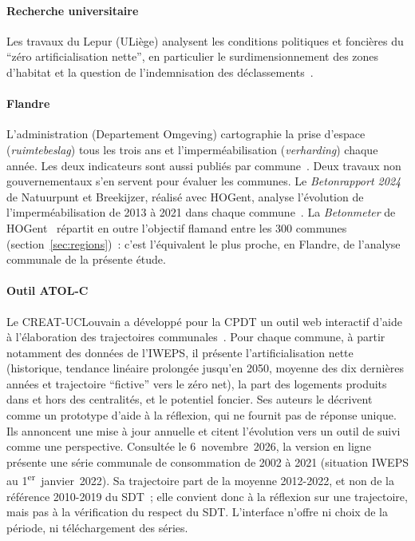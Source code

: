 \documentclass[11pt,a4paper]{report}
\begin{document}
\paragraph{Recherche universitaire} Les travaux du Lepur (ULiège) analysent les conditions politiques et foncières du \enquote{zéro artificialisation nette}, en particulier le surdimensionnement des zones d'habitat et la question de l'indemnisation des déclassements~\citep{halleux2025}.

\paragraph{Flandre} L'administration (Departement Omgeving) cartographie la prise d'espace (\emph{ruimtebeslag}) tous les trois ans et l'imperméabilisation (\emph{verharding}) chaque année. Les deux indicateurs sont aussi publiés par commune~\citep{vlaanderen_landgebruik2025}. Deux travaux non gouvernementaux s'en servent pour évaluer les communes. Le \emph{Betonrapport 2024} de Natuurpunt et Breekijzer, réalisé avec HOGent, analyse l'évolution de l'imperméabilisation de 2013 à 2021 dans chaque commune~\citep{betonrapport2024}. La \emph{Betonmeter} de HOGent~\citep{betonmeter2025} répartit en outre l'objectif flamand entre les 300 communes (section~\ref{sec:regions})~: c'est l'équivalent le plus proche, en Flandre, de l'analyse communale de la présente étude.

\paragraph{Outil ATOL-C} Le CREAT-UCLouvain a développé pour la CPDT un outil web interactif d'aide à l'élaboration des trajectoires communales~\citep{atolc2025}. Pour chaque commune, à partir notamment des données de l'IWEPS, il présente l'artificialisation nette (historique, tendance linéaire prolongée jusqu'en 2050, moyenne des dix dernières années et trajectoire \enquote{fictive} vers le zéro net), la part des logements produits dans et hors des centralités, et le potentiel foncier. Ses auteurs le décrivent comme un prototype d'aide à la réflexion, qui ne fournit pas de réponse unique. Ils annoncent une mise à jour annuelle et citent l'évolution vers un outil de suivi comme une perspective. Consultée le 6~novembre~2026, la version en ligne présente une série communale de consommation de 2002 à 2021 (situation IWEPS au 1\textsuperscript{er}~janvier~2022). Sa trajectoire part de la moyenne 2012-2022, et non de la référence 2010-2019 du SDT~; elle convient donc à la réflexion sur une trajectoire, mais pas à la vérification du respect du SDT. L'interface n'offre ni choix de la période, ni téléchargement des séries.
\end{document}
